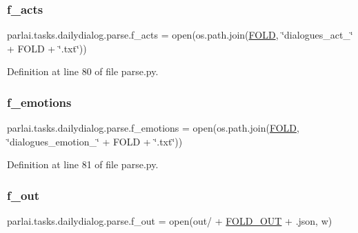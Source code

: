 \subsubsection{\texorpdfstring{f\+\_\+acts}{f\_acts}}
{\footnotesize\ttfamily parlai.\+tasks.\+dailydialog.\+parse.\+f\+\_\+acts = open(os.\+path.\+join(\hyperlink{namespaceparlai_1_1tasks_1_1dailydialog_1_1parse_a8c9e030332871e8cb356bcb74c0ddc8c}{F\+O\+LD}, \char`\"{}dialogues\+\_\+act\+\_\+\char`\"{} + F\+O\+LD + \char`\"{}.txt\char`\"{}))}



Definition at line 80 of file parse.\+py.

\mbox{\label{namespaceparlai_1_1tasks_1_1dailydialog_1_1parse_a6dacd6c7ec446b2a8c20bce692c3f0a2}} 
\subsubsection{\texorpdfstring{f\+\_\+emotions}{f\_emotions}}
{\footnotesize\ttfamily parlai.\+tasks.\+dailydialog.\+parse.\+f\+\_\+emotions = open(os.\+path.\+join(\hyperlink{namespaceparlai_1_1tasks_1_1dailydialog_1_1parse_a8c9e030332871e8cb356bcb74c0ddc8c}{F\+O\+LD}, \char`\"{}dialogues\+\_\+emotion\+\_\+\char`\"{} + F\+O\+LD + \char`\"{}.txt\char`\"{}))}



Definition at line 81 of file parse.\+py.

\mbox{\label{namespaceparlai_1_1tasks_1_1dailydialog_1_1parse_ab6bfab164fed7ef268d5494379f02aee}} 
\subsubsection{\texorpdfstring{f\+\_\+out}{f\_out}}
{\footnotesize\ttfamily parlai.\+tasks.\+dailydialog.\+parse.\+f\+\_\+out = open(\textquotesingle{}out/\textquotesingle{} + \hyperlink{namespaceparlai_1_1tasks_1_1dailydialog_1_1parse_ae6d3cefc4e18c51bfedecae2c5bc875d}{F\+O\+L\+D\+\_\+\+O\+UT} + \textquotesingle{}.json\textquotesingle{}, \textquotesingle{}w\textquotesingle{})}



